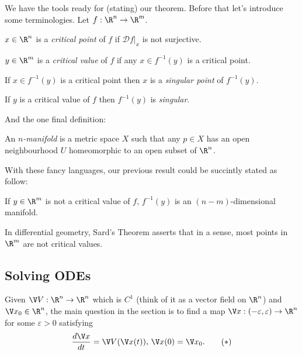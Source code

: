 \documentclass[a4paper]{article}
\newcommand*{\D}{\mathcal{D}}
\theoremstyle{definition}
\begin{document}
We have the tools ready for (stating) our theorem. Before that let's introduce some terminologies. Let \(f: \R^n \to \R^m\).

\begin{definition}
  \(x \in \R^n\) is a \emph{critical point} of \(f\) if \(\D f|_x\) is not surjective.
\end{definition}

\begin{definition}
  \(y \in \R^m\) is a \emph{critical value} of \(f\) if any \(x \in f^{-1}(y)\) is a critical point.
\end{definition}

\begin{definition}[Singular]
  If \(x \in f^{-1}(y)\) is a critical point then \(x\) is a \emph{singular point} of \(f^{-1}(y)\).

  If \(y\) is a critical value of \(f\) then \(f^{-1}(y)\) is \emph{singular}.
\end{definition}

And the one final definition:

\begin{definition}[Manifold]
  An \emph{\(n\)-manifold} is a metric space \(X\) such that any \(p \in X\) has an open neighbourhood \(U\) homeomorphic to an open subset of \(\R^n\).
\end{definition}

With these fancy languages, our previous result could be succintly stated as follow:

\begin{theorem}
  \label{thm:implicit}
  If \(y \in \R^m\) is not a critical value of \(f\), \(f^{-1}(y)\) is an \((n - m)\)-dimensional manifold.
\end{theorem}

\begin{remark}
  In differential geometry, Sard's Theorem asserts that in a sense, most points in \(\R^m\) are not critical values.
\end{remark}

\subsection{Solving ODEs}

Given \(\V V: \R^n \to \R^n\) which is \(C^1\) (think of it as a vector field on \(\R^n\)) and \(\V x_0 \in \R^n\), the main question in the section is to find a map \(\V x: (-\varepsilon, \varepsilon) \to \R^n\) for some \(\varepsilon > 0\) satisfying
\begin{equation*}
  \label{eqn:ODE}
  \frac{d \V x}{dt} = \V V(\V x(t)), \, \V x(0) = \V x_0.
  \tag{\(\ast\)}
\end{equation*}
\end{document}
